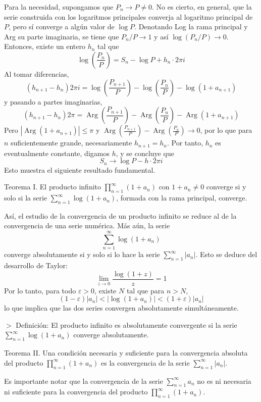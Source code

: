 \documentclass{article}
\theoremstyle{nonumberplain}
\begin{document}
Para la necesidad, supongamos que \(P_n \to P \neq 0\). No es cierto, en general, que la serie construida con los logaritmos principales converja al logaritmo principal de \(P\), pero sí converge a algún valor de \(\log P\). Denotando Log la rama principal y Arg su parte imaginaria, se tiene que \(P_n / P \to 1\) y así \(\log(P_n / P) \to 0\). Entonces, existe un entero \(h_n\) tal que
\[
\log\left(\frac{P_n}{P}\right) = S_n - \log P + h_n \cdot 2\pi i
\]
Al tomar diferencias,
\[
(h_{n+1} - h_n) 2\pi i = \log\left(\frac{P_{n+1}}{P}\right) - \log\left(\frac{P_n}{P}\right) - \log(1 + a_{n+1})
\]
y pasando a partes imaginarias,
\[
(h_{n+1} - h_n) 2\pi = \operatorname{Arg}\left(\frac{P_{n+1}}{P}\right) - \operatorname{Arg}\left(\frac{P_n}{P}\right) - \operatorname{Arg}(1 + a_{n+1})
\]
Pero \(|\operatorname{Arg}(1 + a_{n+1})| \leq \pi\) y \(\operatorname{Arg}\left(\frac{P_{n+1}}{P}\right) - \operatorname{Arg}\left(\frac{P_n}{P}\right) \to 0\), por lo que para \(n\) suficientemente grande, necesariamente \(h_{n+1} = h_n\). Por tanto, \(h_n\) es eventualmente constante, digamos \(h\), y se concluye que
\[
S_n \to \log P - h\cdot 2\pi i
\]
Esto muestra el siguiente resultado fundamental.

Teorema I.  
El producto infinito \(\prod_{n=1}^\infty (1+a_n)\) con \(1+a_n \neq 0\) converge si y solo si la serie \(\sum_{n=1}^\infty \log(1 + a_n)\), formada con la rama principal, converge.

Así, el estudio de la convergencia de un producto infinito se reduce al de la convergencia de una serie numérica. Más aún, la serie
\[
\sum_{n=1}^\infty \log(1 + a_n)
\]
converge absolutamente si y solo si lo hace la serie \(\sum_{n=1}^\infty |a_n|\). Esto se deduce del desarrollo de Taylor:
\[
\lim_{z \to 0} \frac{\log(1+z)}{z} = 1
\]
Por lo tanto, para todo \(\varepsilon > 0\), existe \(N\) tal que para \(n > N\),
\[
(1-\varepsilon)|a_n| < |\log(1 + a_n)| < (1+\varepsilon)|a_n|
\]
lo que implica que las dos series convergen absolutamente simultáneamente.

$>$ Definición: El producto infinito es absolutamente convergente si la serie \(\sum_{n=1}^\infty \log(1 + a_n)\) converge absolutamente.

Teorema II.  
Una condición necesaria y suficiente para la convergencia absoluta del producto \(\prod_{n=1}^\infty (1+a_n)\) es la convergencia de la serie \(\sum_{n=1}^\infty |a_n|\).

Es importante notar que la convergencia de la serie \(\sum_{n=1}^\infty a_n\) no es ni necesaria ni suficiente para la convergencia del producto \(\prod_{n=1}^\infty (1+a_n)\).
\end{document}
